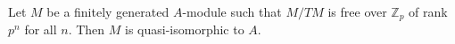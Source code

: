 Let $M$ be a finitely generated $A$-module such that $M/TM$ is free over $\mathbb{Z}_p$ of rank $p^n$ for all $n$. Then $M$ is quasi-isomorphic to $A$.
